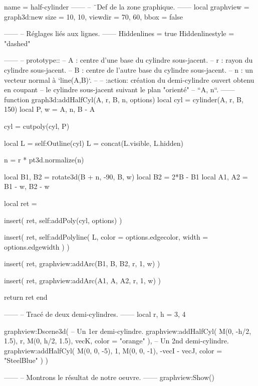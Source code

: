 \documentclass[border = 3pt]{standalone}
\begin{document}
\begin{luadraw*}{name = half-cylinder}
------
-- ¨Def de la zone graphique.
------
local graphview = graph3d:new{
  size    = {10, 10},
  viewdir = {70, 60},
  bbox    = false
}

------
-- Réglages liés aux lignes.
------
Hiddenlines     = true
Hiddenlinestyle = "dashed"

------
-- prototype::
--     A : centre d'une base du cylindre sous-jacent.
--     r : rayon du cylindre sous-jacent.
--     B : centre de l'autre base du cylindre sous-jacent.
--     n : un vecteur normal à `line(A,B)`.
--
--     :action: création du demi-cylindre ouvert obtenu en coupant
--              le cylindre sous-jacent suivant le plan "orienté"
--              ``{A, n}``.
------
function graph3d:addHalfCyl(A, r, B, n, options)
  local cyl  = cylinder(A, r, B, 150)
  local P, w = {A, n}, B - A

  cyl = cutpoly(cyl, P)

  local L = self:Outline(cyl)
  L = concat(L.visible, L.hidden)

  n = r * pt3d.normalize(n)

  local B1, B2 = rotate3d(B + n, -90, {B, w})
  local B2     = 2*B - B1
  local A1, A2 = B1 - w, B2 - w

  local ret = {}

  insert(
    ret,
    self:addPoly(cyl, options)
  )

  insert(
    ret,
    self:addPolyline(
      L,
      {
        color = options.edgecolor,
        width = options.edgewidth
      }
    )
  )

  insert(
    ret,
    graphview:addArc(B1, B, B2, r, 1, w)
  )

  insert(
    ret,
    graphview:addArc(A1, A, A2, r, 1, w)
  )

  return ret
end

------
-- Tracé de deux demi-cylindres.
------
local r, h = 3, 4

graphview:Dscene3d(
-- Un 1er demi-cylindre.
  graphview:addHalfCyl(
    M(0, -h/2, 1.5), r,
    M(0, h/2, 1.5), vecK,
    {color = "orange"}
  ),
-- Un 2nd demi-cylindre.
  graphview:addHalfCyl(
    M(0, 0, -5), 1,
    M(0, 0, -1), -vecI - vecJ,
    {color = "SteelBlue"}
  )
)

------
-- Montrons le résultat de notre oeuvre.
------
graphview:Show()
\end{luadraw*}
\end{document}
